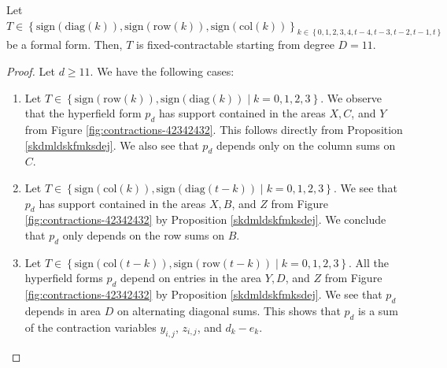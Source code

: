 \begin{proposition}\label{prop:contracted-part-1}
    Let \( T \in \left\{ \mathrm{sign}(\mathrm{diag}(k)), \mathrm{sign}(\mathrm{row}(k)), \mathrm{sign}(\mathrm{col}(k)) \right\}_{k \in \left\{ 0,1,2,3,4,t-4,t-3,t-2,t-1,t \right\}}\) be a formal form. Then, \( T \) is fixed-contractable starting from degree \( D = 11 \).
\end{proposition}

\begin{proof}
    Let \( d \geq 11 \).
    We have the following cases:
    \begin{enumerate}
        \item Let \( T \in \left\{ \mathrm{sign}(\mathrm{row}(k)), \mathrm{sign}(\mathrm{diag}(k)) \mid k = 0,1,2,3 \right\} \). We observe that the hyperfield form \( p_d \) has support contained in the areas \( X, C \), and \( Y \) from Figure \ref{fig:contractions-42342432}. This follows directly from Proposition \ref{skdmldskfmksdej}. We also see that \( p_d \) depends only on the column sums on \( C \).
        \item Let \( T \in \left\{ \mathrm{sign}(\mathrm{col}(k)), \mathrm{sign}(\mathrm{diag}(t-k)) \mid k = 0,1,2,3 \right\} \). We see that \( p_d \) has support contained in the areas \( X, B \), and \( Z \) from Figure \ref{fig:contractions-42342432} by Proposition \ref{skdmldskfmksdej}. We conclude that \( p_d \) only depends on the row sums on \( B \).
        \item Let \( T \in \left\{ \mathrm{sign}(\mathrm{col}(t-k)), \mathrm{sign}(\mathrm{row}(t-k)) \mid k = 0,1,2,3 \right\} \). All the hyperfield forms \( p_d \) depend on entries in the area \( Y, D \), and \( Z \) from Figure \ref{fig:contractions-42342432} by Proposition \ref{skdmldskfmksdej}. We see that \( p_d \) depends in area \( D \) on alternating diagonal sums. This shows that \( p_d \) is a sum of the contraction variables \( y_{i,j} \), \( z_{i,j} \), and \( d_k - e_k \).

    \end{enumerate}
\end{proof}


